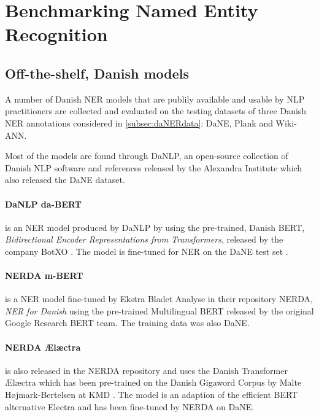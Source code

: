 \documentclass[main.tex]{subfiles}
\begin{document}

\section{Benchmarking Named Entity Recognition}
\subsection{Off-the-shelf, Danish models}
\label{sec:exidan}
A number of Danish NER models that are publily available and usable by NLP practitioners are collected and evaluated on the testing datasets of three Danish NER annotations considered in \ref{subsec:daNERdata}: DaNE, Plank and Wiki-ANN.

Most of the models are found through DaNLP\footnotemark, an open-source collection of Danish NLP software and references released by the Alexandra Institute which also released the DaNE dataset.
\paragraph{DaNLP da-BERT}
is an NER model produced by DaNLP by using the pre-trained, Danish BERT, \emph{Bidirectional Encoder Representations from Transformers}, \cite{devlin2019bert} released by the company BotXO \cite{botxo2019dabert}.
The model is fine-tuned for NER on the DaNE test set \cite{hvingelby2020dane}.
\paragraph{NERDA m-BERT}
is a NER model fine-tuned by Ekstra Bladet Analyse in their repository NERDA\footnotemark, \emph{NER for Danish} using the pre-trained Multilingual BERT released by the original Google Research BERT team\cite{devlin2019bert}.
The training data was also DaNE.
\paragraph{NERDA Ælæctra}
is also released in the NERDA repository and uses the Danish Transformer Ælæctra which has been pre-trained on the Danish Gigaword Corpus by Malte Højmark-Bertelsen at KMD \cite{bertelsen2020lctra}.
The model is an adaption of the efficient BERT alternative Electra \cite{clark2020electra} and has been fine-tuned by NERDA on DaNE.
\end{document}
